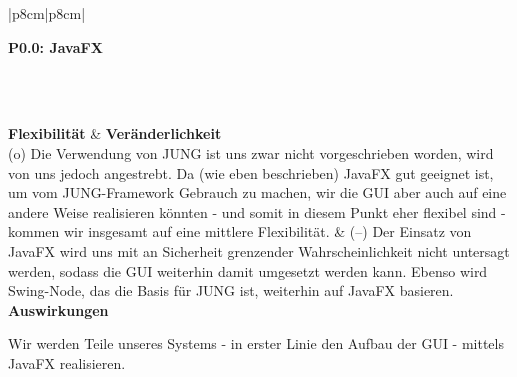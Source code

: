 \documentclass[enabledeprecatedfontcommands,fontsize=11pt,paper=a4,twoside]{scrartcl}
\newcounter{one}
\newcounter{two}[one]
\newcommand{\tone}{0\theone}
\newcommand{\two}{\stepcounter{two}0\thetwo}
\begin{document}
\newpage
\begin{tabular} {|p{8cm}|p{8cm}|}
	\hline
	 {\parbox{16cm}{\textbf{\hypertarget{j}{P\tone.\two}: JavaFX }} } \\ \hline\hline 
	\rule{0pt}{10ex}\\ [7ex] \hline
	\textbf{Flexibilität}  & \textbf{Veränderlichkeit} \\
	(o) Die Verwendung von JUNG ist uns zwar nicht vorgeschrieben worden, wird von uns jedoch angestrebt. Da (wie eben beschrieben) JavaFX gut geeignet ist, um vom JUNG-Framework Gebrauch zu machen, wir die GUI aber auch auf eine andere Weise realisieren könnten - und somit in diesem Punkt eher flexibel sind - kommen wir insgesamt auf eine mittlere Flexibilität. &
	(--) Der Einsatz von JavaFX wird uns mit an Sicherheit grenzender Wahrscheinlichkeit nicht untersagt werden, sodass die GUI weiterhin damit umgesetzt werden kann. Ebenso wird Swing-Node, das die Basis für JUNG ist,  weiterhin auf JavaFX basieren.\\
	\hline
	 {\textbf{Auswirkungen}} \\
	 {\parbox{16cm}{Wir werden Teile unseres Systems - in erster Linie den Aufbau der GUI - mittels JavaFX realisieren. } }\\ [2ex]\hline
\end{tabular}
\\ \\ \\ \\ \\
\end{document}
